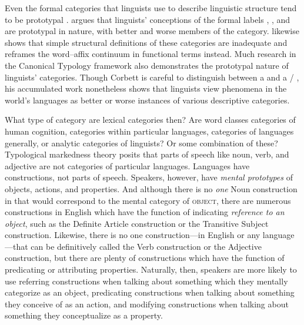 Even the formal categories that linguists use to describe linguistic structure tend to be prototypal \parencite[xii, 201]{Taylor2003}. \textcite[§11.1]{Taylor2003} argues that linguists' conceptions of the formal labels , , and  are prototypal in nature, with better and worse members of the category. \textcite{Haspelmath2005} likewise shows that simple structural definitions of these categories are inadequate and reframes the word–affix continuum in functional terms instead. Much research in the Canonical Typology framework \parencite{Corbett2005} also demonstrates the prototypal nature of linguists' categories. Though Corbett is careful to distinguish between a  and a  /  \parencite[142]{Corbett2010}, his accumulated work nonetheless shows that linguists view phenomena in the world's languages as better or worse instances of various descriptive categories.

What type of category are lexical categories then? Are word classes categories of human cognition, categories within particular languages, categories of languages generally, or analytic categories of linguists? Or some combination of these? Typological markedness theory posits that parts of speech like noun, verb, and adjective are not categories of particular languages. Languages have constructions, not parts of speech. Speakers, however, have \emph{mental prototypes} of objects, actions, and properties. And although there is no \emph{one} Noun construction in  that would correspond to the mental category of \textsc{object}, there are numerous constructions in English which have the function of indicating \emph{reference to an object}, such as the Definite Article construction or the Transitive Subject construction. Likewise, there is no one construction—in English or any language—that can be definitively called the Verb construction or the Adjective construction, but there are plenty of constructions which have the function of predicating or attributing properties. Naturally, then, speakers are more likely to use referring constructions when talking about something which they mentally categorize as an object, predicating constructions when talking about something they conceive of as an action, and modifying constructions when talking about something they conceptualize as a property.

